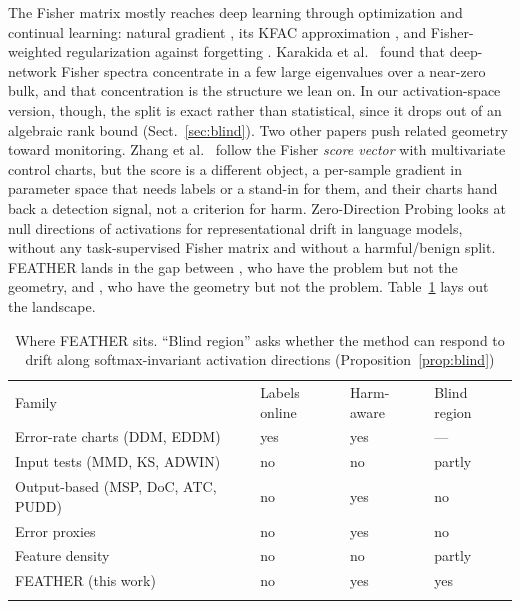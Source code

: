 \documentclass[graybox]{SNmult}
\begin{document}
The Fisher matrix mostly reaches deep learning through optimization and
continual learning: natural gradient \cite{amari1998natural}, its KFAC
approximation \cite{martens2015kfac}, and Fisher-weighted regularization
against forgetting \cite{kirkpatrick2017overcoming}. Karakida et al.\
\cite{karakida2019universal} found that deep-network Fisher spectra concentrate
in a few large eigenvalues over a near-zero bulk, and that concentration is the
structure we lean on. In our activation-space version, though, the split is
exact rather than statistical, since it drops out of an algebraic rank bound
(Sect.~\ref{sec:blind}). Two other papers push related geometry toward
monitoring. Zhang et al.\ \cite{zhang2023score} follow the Fisher \emph{score
vector} with multivariate control charts, but the score is a different object,
a per-sample gradient in parameter space that needs labels or a stand-in for
them, and their charts hand back a detection signal, not a criterion for harm.
Zero-Direction Probing \cite{pandey2025zdp} looks at null directions of
activations for representational drift in language models, without any
task-supervised Fisher matrix and without a harmful/benign split. FEATHER
lands in the gap between \cite{amoukou2024sequential}, who have the problem
but not the geometry, and \cite{pandey2025zdp}, who have the geometry but not
the problem. Table~\ref{tab:positioning} lays out the landscape.

\begin{table}[!t]
\caption{Where FEATHER sits. ``Blind region'' asks whether the method can
respond to drift along softmax-invariant activation directions
(Proposition~\ref{prop:blind})}
\label{tab:positioning}
\begin{tabular}{p{4.6cm}p{1.6cm}p{1.6cm}p{1.6cm}}
\hline\noalign{\smallskip}
Family & Labels online & Harm-aware & Blind region \\
\noalign{\smallskip}\svhline\noalign{\smallskip}
Error-rate charts (DDM, EDDM) & yes & yes & --- \\
Input tests (MMD, KS, ADWIN) & no & no & partly \\
Output-based (MSP, DoC, ATC, PUDD) & no & yes & no \\
Error proxies \cite{amoukou2024sequential} & no & yes & no \\
Feature density \cite{lee2018mahalanobis} & no & no & partly \\
FEATHER (this work) & no & yes & yes \\
\noalign{\smallskip}\hline\noalign{\smallskip}
\end{tabular}
\end{table}
\end{document}
